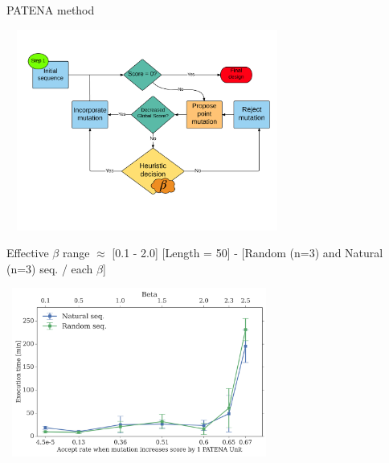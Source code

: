 \documentclass{beamer}
\begin{document}
\begin{frame}[plain]{PATENA method}
\begin{adjustwidth}{-2.0em}{-2.0em}
\includegraphics[width=350px,height=250px]{../img/patenaReduced-Beta.png} 
\end{adjustwidth}
\end{frame}

























\begin{frame}[plain]{Effective $\beta$ range $\approx$ [0.1 - 2.0]}
\centering
[Length = 50] - [Random (n=3) and Natural (n=3) seq. / each $\beta$] \\
\begin{adjustwidth}{-1.5em}{-2.5em}
\includegraphics[width=330px,height=210px]{../img/beta-vs-time-length50-300dpi.png} 
\end{adjustwidth}
\end{frame}
\end{document}

